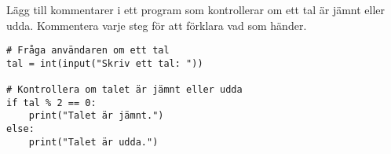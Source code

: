 \begin{exercise}
Lägg till kommentarer i ett program som kontrollerar om ett tal är jämnt eller udda. Kommentera varje steg för att förklara vad som händer.
\end{exercise}
\begin{solution}
\begin{lstlisting}
# Fråga användaren om ett tal
tal = int(input("Skriv ett tal: "))

# Kontrollera om talet är jämnt eller udda
if tal % 2 == 0:
    print("Talet är jämnt.")
else:
    print("Talet är udda.")
\end{lstlisting}
\end{solution}

